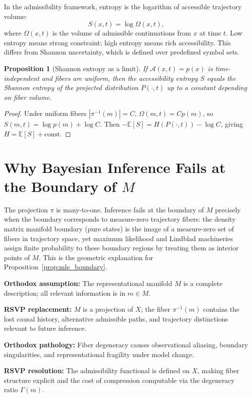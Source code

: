 \documentclass[11pt, openright, twoside]{book}
\theoremstyle{plain}
\newtheorem{proposition}[theorem]{Proposition}
\theoremstyle{definition}
\theoremstyle{remark}
\newcommand{\Sfield}{S}
\newcommand{\Admiss}{\mathcal{A}}
\newcommand{\Traj}{X}
\newcommand{\Rep}{M}
\newcommand{\proj}{\pi}
\begin{document}
In the admissibility framework, entropy is the logarithm of accessible trajectory volume:
\begin{equation}
  \Sfield(x,t) = \log\Omega(x,t),
\end{equation}
where $\Omega(x,t)$ is the volume of admissible continuations from $x$ at time $t$. Low
entropy means strong constraint; high entropy means rich accessibility. This differs from
Shannon uncertainty, which is defined over predefined symbol sets.

\begin{proposition}[Shannon entropy as a limit]
\label{prop:shannon_limit}
If $\Admiss(x,t)=p(x)$ is time-independent and fibers are uniform, then the accessibility
entropy $\Sfield$ equals the Shannon entropy of the projected distribution $P(\cdot,t)$
up to a constant depending on fiber volume.
\end{proposition}

\begin{proof}
Under uniform fibers $|\proj^{-1}(m)|=C$, $\Omega(m,t)=Cp(m)$, so $\Sfield(m,t)=\log p(m)+\log C$.
Then $-\mathbb{E}[\Sfield]=H(P(\cdot,t))-\log C$, giving $H=\mathbb{E}[\Sfield]+\mathrm{const}$.
\end{proof}

\section{Why Bayesian Inference Fails at the Boundary of $\Rep$}

The projection $\proj$ is many-to-one. Inference fails at the boundary of $\Rep$ precisely
when the boundary corresponds to measure-zero trajectory fibers: the density matrix manifold
boundary (pure states) is the image of a measure-zero set of fibers in trajectory space,
yet maximum likelihood and Lindblad machineries assign finite probability to these boundary
regions by treating them as interior points of $\Rep$. This is the geometric explanation
for Proposition~\ref{prop:mle_boundary}.

\begin{compbox}
\textbf{Orthodox assumption:} The representational manifold $\Rep$ is a complete description;
all relevant information is in $m\in\Rep$.

\textbf{RSVP replacement:} $\Rep$ is a projection of $\Traj$; the fiber $\proj^{-1}(m)$
contains the lost causal history, alternative admissible paths, and trajectory distinctions
relevant to future inference.

\textbf{Orthodox pathology:} Fiber degeneracy causes observational aliasing,
boundary singularities, and representational fragility under model change.

\textbf{RSVP resolution:} The admissibility functional is defined on $\Traj$, making
fiber structure explicit and the cost of compression computable via the degeneracy ratio $\Gamma(m)$.
\end{compbox}
\end{document}
